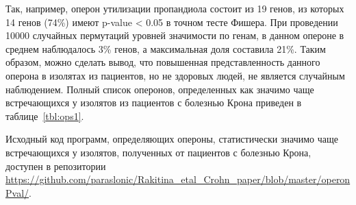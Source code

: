Так, например, оперон утилизации пропандиола состоит из 19 генов, из которых 14 генов (74\%) имеют p-value < 0.05 в точном тесте Фишера. При проведении 10000 случайных пермутаций уровней значимости по генам, в данном опероне в среднем наблюдалось 3\% генов, а максимальная доля составила 21\%. Таким образом, можно сделать вывод, что повышенная представленность данного оперона в изолятах из пациентов, но не здоровых людей, не является случайным наблюдением. Полный список оперонов, определенных как значимо чаще встречающихся у изолятов из пациентов с болезнью Крона приведен в таблице~\ref{tbl:ops1}. 

\begin{table}[htbp]
  \centering
  \caption{Список оперонов статистически значимо пере-представленных в группе штаммов \textit{E. coli} изолированных от пациентов с болезнью Крона. N - количество генов, Pobs - наблюдаемая доля перепредставленных генов в опероне, Pmean - средняя доля перепредставленных генов при случайных пермутациях, Pmax - максимальная доля перепредставленных генов при случайных пермутациях.}
  \label{tbl:ops1}
  \setlength{\fboxsep}{10pt}%
  \setlength{\fboxrule}{0pt}%
  \end{table}

Исходный код программ, определяющих опероны, статистически значимо чаще встречающихся у изолятов, полученных от пациентов с болезнью Крона, доступен в репозитории \url{https://github.com/paraslonic/Rakitina_etal_Crohn_paper/blob/master/operonPval/}.
